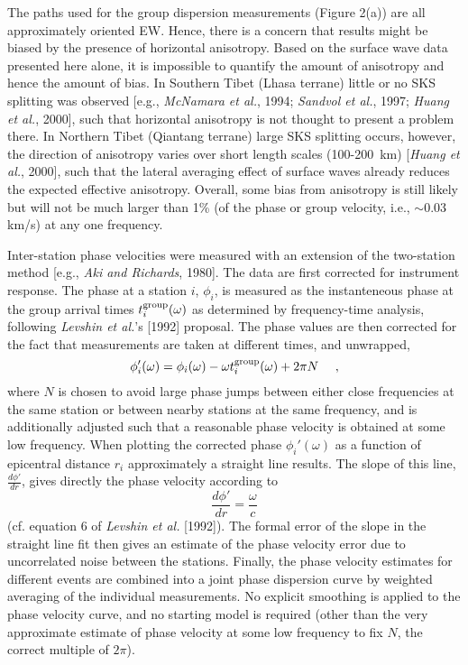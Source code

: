 \documentclass[12pt]{article}
\renewcommand{\remove}[1]{}
\begin{document}
The paths used for the group dispersion measurements (Figure 2(a)) are all
  approximately oriented EW. Hence, there is a concern that results might be
  biased by the presence of horizontal anisotropy.  Based on the surface wave
  data presented here alone, it is impossible to quantify the amount of
  anisotropy and hence the amount of bias.  In Southern Tibet (Lhasa terrane)
little or no  SKS splitting was observed [e.g., {\it McNamara et
    al.}, 1994; {\it Sandvol et    al.}, 1997; {\it Huang et    al.}, 2000],
  such that horizontal anisotropy is not thought to present a problem there.  In
  Northern Tibet (Qiantang terrane) large SKS splitting occurs, however, the direction of
  anisotropy varies over short length scales (100-200~km) [{\it Huang et
    al.}, 2000], such that the lateral averaging effect of surface waves already
  reduces the expected effective anisotropy.  Overall, some bias from anisotropy
  is still likely but will not be much larger than 1\% (of the
phase or group
velocity, i.e., $\sim$0.03 km/s) at any one frequency.

Inter-station phase velocities were measured with an extension of the two-station method [e.g., {\it Aki
and Richards}, 1980]. The data are first corrected for instrument response\remove{ and timing errors}. The phase at
a station $i$, $\phi_i$, is measured as the instanteneous phase at the group arrival times $t^{\rm
group}_i(\omega)$ as determined by frequency-time analysis, following {\it Levshin et al.}'s [1992]
proposal.  The phase values are then corrected for the fact that measurements are taken at different times,
and unwrapped,
 \begin{displaymath}
\phi_i'(\omega)=\phi_i(\omega)-\omega t^{\rm group}_i(\omega)+2\pi N \ \ \ \ ,
\end{displaymath}
where $N$ is chosen to avoid large phase jumps between either close frequencies at
the same station or between nearby stations at the same frequency, and
is additionally adjusted such that a
reasonable phase velocity is obtained at some low frequency.  When plotting the corrected phase
$\phi_i'(\omega)$ as a function of epicentral distance $r_i$ approximately a straight line results.  The
slope of this line, $\frac{d\phi'}{dr}$, gives directly the phase velocity according to \begin{displaymath}
\frac{d\phi'}{dr}=\frac{\omega}{c} \end{displaymath} (cf. equation 6 of {\it Levshin et al.} [1992]). The
formal error of the slope in the straight line fit then gives an estimate of the phase velocity error due
to uncorrelated noise between the stations.  Finally, the phase velocity estimates for different events are
combined into a joint phase dispersion curve by weighted averaging of the individual measurements.  No
explicit smoothing is applied to the phase velocity curve, and no starting model is required (other than
the very approximate estimate of phase velocity at some low frequency to fix $N$, the correct multiple of
$2\pi$).
\end{document}
